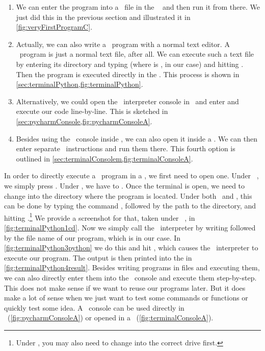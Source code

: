 \begin{enumerate}%
%
\item We can enter the program into a \python\ file in the \pycharm\  and then run it from there. %
We just did this in the previous section and illustrated it in \cref{fig:veryFirstProgramC}.%
%
\item Actually, we can also write a \python\ program with a normal text editor. %
A \python\ program is just a normal text file, after all. %
We can execute such a text file by entering its directory and typing  (where  is , in our case) and hitting \keys{\enter}. %
Then the program is executed directly in the . %
This process is shown in \cref{sec:terminalPython,fig:terminalPython}.%
%
\item Alternatively, we could open the \python\ interpreter console in \pycharm\ and enter and execute our code line-by-line. %
This is sketched in \cref{sec:pycharmConsole,fig:pycharmConsoleA}.%
%
\item Besides using the \python\ console inside \pycharm, we can also open it inside a . %
We can then enter separate \python\ instructions and run them there. %
This fourth option is outlined in \cref{sec:terminalConsolem,fig:terminalConsoleA}.%
%
\end{enumerate}%
%
%
\label{sec:terminalPython}%
In order to directly execute a \python\ program in a , we first need to open one.
Under \ubuntu\ \linux, we simply press \ubuntuTerminal.
Under \microsoftWindows, we have to \windowsTerminal.
Once the terminal is open, we need to change into the directory where the program is located.
Under both \linux\ and \microsoftWindows, this can be done by typing the command , followed by the path to the directory, and hitting \keys{\enter}.\footnote{%
Under \microsoftWindows, you may also need to change into the correct drive first.}
We provide a screenshot for that, taken under \ubuntu\ \linux, in \cref{fig:terminalPython1cd}.
Now we simply call the \python\ interpreter by writing  followed by the file name of our program, which is  in our case.
In \cref{fig:terminalPython3python} we do this and hit \keys{\enter}, which causes the \python\ interpreter to execute our program.
The output  is then printed into the  in \cref{fig:terminalPython4result}.%
\endhsection%
%
%
\label{sec:pycharmConsole}%
Besides writing programs in files and executing them, we can also directly enter them into the \python\ console and execute them step-by-step.
This does not make sense if we want to reuse our programs later.
But it does make a lot of sense when we just want to test some commands or functions or quickly test some idea.
A \python\ console can be used directly in \pycharm~(\cref{fig:pycharmConsoleA}) or opened in a ~(\cref{fig:terminalConsoleA}).

